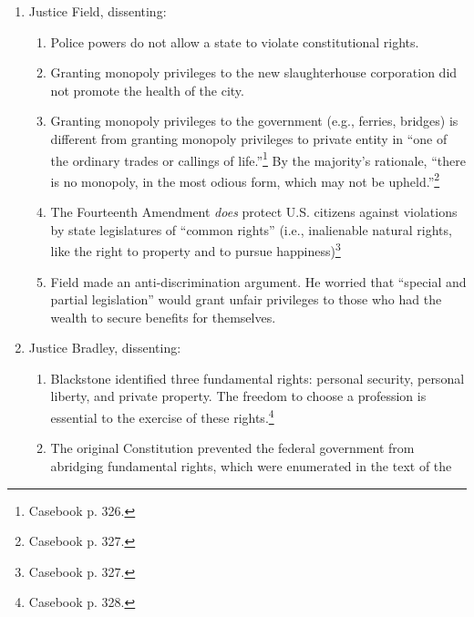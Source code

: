 \begin{enumerate}
\begin{enumerate}
        \item \textbf{Butchers' Argument 4}: the statute denied equal protection.
        \begin{enumerate}
            \item No. The equal protection clause applies only to 
            slavery.\footnote{Casebook p. 326.}
        \end{enumerate}
    \end{enumerate}
    \item Justice Field, dissenting:
    \begin{enumerate}
        \item Police powers do not allow a state to violate constitutional 
        rights.
        \item Granting monopoly privileges to the new slaughterhouse 
        corporation did not promote the health of the city.
        \item Granting monopoly privileges to the government (e.g., ferries, 
        bridges) is different from granting monopoly privileges to private 
        entity in ``one of the ordinary trades or callings of 
        life.''\footnote{Casebook p. 326.} By the majority's rationale, 
        ``there is no monopoly, in the most odious form, which may not be 
        upheld.''\footnote{Casebook p. 327.}
        \item The Fourteenth Amendment \emph{does} protect U.S. citizens 
        against violations by state legislatures of ``common 
        rights'' (i.e., inalienable natural rights, like the right to property 
        and to pursue happiness)\footnote{Casebook p. 327.}
        \item Field made an anti-discrimination argument. He worried that 
        ``special and partial legislation'' would grant unfair privileges to 
        those who had the wealth to secure benefits for themselves.
    \end{enumerate}
    \item Justice Bradley, dissenting:
    \begin{enumerate}
        \item Blackstone identified three fundamental rights: personal 
        security, personal liberty, and private property. The freedom to 
        choose a profession is essential to the exercise of these 
        rights.\footnote{Casebook p. 328.}
        \item The original Constitution prevented the federal government from 
        abridging fundamental rights, which were enumerated in the text of the 

\end{enumerate}
\end{enumerate}
